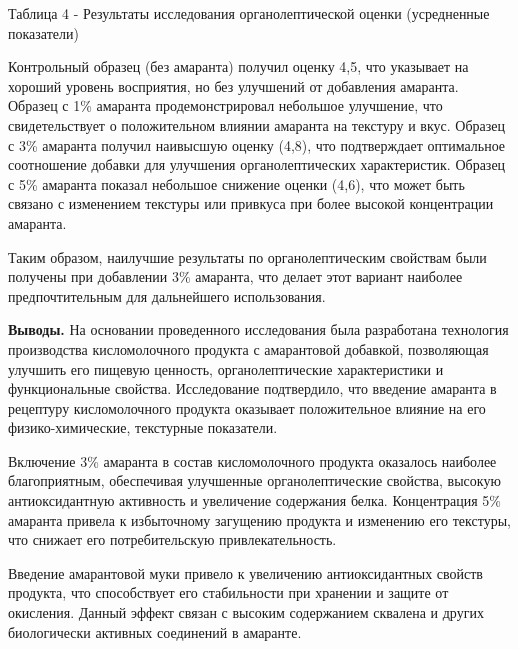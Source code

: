 \begin{table}[H]
\caption*{Таблица 4 - Результаты исследования органолептической оценки (усредненные показатели)}
\centering
{}
\end{table}

\begin{multicols}{2}
Контрольный образец (без амаранта) получил оценку 4,5, что указывает на
хороший уровень восприятия, но без улучшений от добавления амаранта.
Образец с 1\% амаранта продемонстрировал небольшое улучшение, что
свидетельствует о положительном влиянии амаранта на текстуру и вкус.
Образец с 3\% амаранта получил наивысшую оценку (4,8), что подтверждает
оптимальное соотношение добавки для улучшения органолептических
характеристик. Образец с 5\% амаранта показал небольшое снижение оценки
(4,6), что может быть связано с изменением текстуры или привкуса при
более высокой концентрации амаранта.

Таким образом, наилучшие результаты по органолептическим свойствам были
получены при добавлении 3\% амаранта, что делает этот вариант наиболее
предпочтительным для дальнейшего использования.

{\bfseries Выводы.} На основании проведенного исследования была разработана
технология производства кисломолочного продукта с амарантовой добавкой,
позволяющая улучшить его пищевую ценность, органолептические
характеристики и функциональные свойства. Исследование подтвердило, что
введение амаранта в рецептуру кисломолочного продукта оказывает
положительное влияние на его физико-химические, текстурные показатели.

Включение 3\% амаранта в состав кисломолочного продукта оказалось
наиболее благоприятным, обеспечивая улучшенные органолептические
свойства, высокую антиоксидантную активность и увеличение содержания
белка. Концентрация 5\% амаранта привела к избыточному загущению
продукта и изменению его текстуры, что снижает его потребительскую
привлекательность.

Введение амарантовой муки привело к увеличению антиоксидантных свойств
продукта, что способствует его стабильности при хранении и защите от
окисления. Данный эффект связан с высоким содержанием сквалена и других
биологически активных соединений в амаранте.


\end{multicols}
